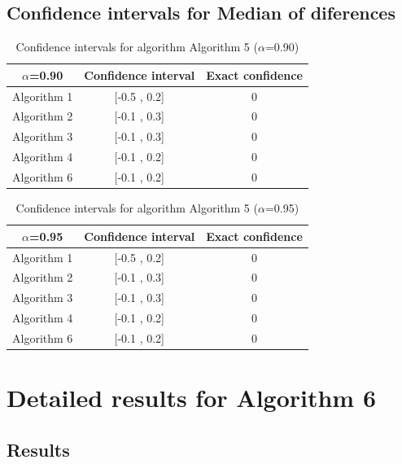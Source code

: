 \documentclass[a4paper,10pt]{article}
\begin{document}
\subsection{Confidence intervals for Median of diferences}

\begin{table}[!htp]
\centering\small
\begin{tabular}{
|c|c|c|}
\hline
 $\alpha$=0.90 & Confidence interval & Exact confidence \\ \hline 
Algorithm 1 & [-0.5 , 0.2] & 0\\ \hline 
Algorithm 2 & [-0.1 , 0.3] & 0\\ \hline 
Algorithm 3 & [-0.1 , 0.3] & 0\\ \hline 
Algorithm 4 & [-0.1 , 0.2] & 0\\ \hline 
Algorithm 6 & [-0.1 , 0.2] & 0\\ \hline 

\end{tabular}
\caption{Confidence intervals for algorithm Algorithm 5 ($\alpha$=0.90)}
\end{table}
\begin{table}[!htp]
\centering\small
\begin{tabular}{
|c|c|c|}
\hline
 $\alpha$=0.95 & Confidence interval & Exact confidence \\ \hline 
Algorithm 1 & [-0.5 , 0.2] & 0\\ \hline 
Algorithm 2 & [-0.1 , 0.3] & 0\\ \hline 
Algorithm 3 & [-0.1 , 0.3] & 0\\ \hline 
Algorithm 4 & [-0.1 , 0.2] & 0\\ \hline 
Algorithm 6 & [-0.1 , 0.2] & 0\\ \hline 

\end{tabular}
\caption{Confidence intervals for algorithm Algorithm 5 ($\alpha$=0.95)}
\end{table}

 \clearpage 


\section{Detailed results for Algorithm 6}


\subsection{Results}
\end{document}
